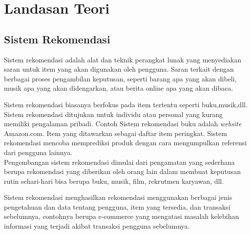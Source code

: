 \chapter{Landasan Teori}
\label{chap:teori}
\section{Sistem Rekomendasi}
\label{sec:sistem rekomendasi}

Sistem rekomendasi adalah alat dan teknik perangkat lunak yang menyediakan saran untuk item yang akan digunakan oleh pengguna. Saran terkait dengan berbagai proses pengambilan keputusan, seperti barang apa yang akan dibeli, musik apa yang akan didengarkan, atau berita online apa yang akan dibaca. %

Sistem rekomendasi biasanya berfokus pada item tertentu seperti buku,musik,dll. Sistem rekomendasi ditujukan untuk individu atau personal yang kurang memiliki pengalaman pribadi. Contoh Sistem rekomendasi buku adalah \textit{website} Amazon.com. Item yang ditawarkan sebagai daftar item peringkat. Sistem rekomendasi mencoba memprediksi produk dengan cara mengumpulkan referensi dari pengguna lainnya.\\ %

Pengembangan sistem rekomendasi dimulai dari pengamatan yang sederhana berupa rekomendasi yang diberikan oleh orang lain dalam membuat keputusan rutin sehari-hari bisa berupa buku, musik, film, rekrutmen karyawan, dll. %

Sistem rekomendasi menghasilkan rekomendasi menggunakan berbagai jenis pengetahuan dan data tentang pengguna, item yang tersedia, dan transaksi sebelumnya, contohnya berupa e-commerce yang mengatasi masalah kelebihan informasi yang terjadi akibat transaksi pengguna sebelumnya. \\ %

